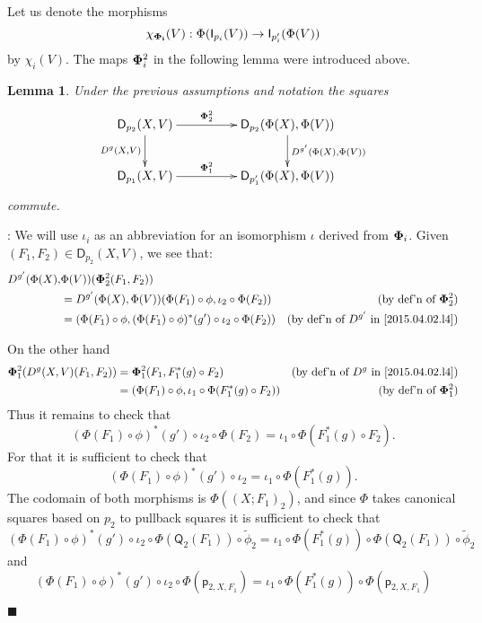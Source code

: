 \documentclass[12pt]{article}
\numberwithin{equation}{section}
\newenvironment{myproof}{{\bf Proof}:}{$\blacksquare$ \vskip 5mm }
\newtheorem{lemma}[proposition]{Lemma}
\newcommand{\by}[1]{\text{(by #1)}}
\newcommand{\sr}{\rightarrow}
\newcommand{\wt}{\widetilde}
\newcommand{\p}{\mathsf{p}}
\newcommand{\D}{\mathsf{D}}
\newcommand{\I}{\mathsf{I}}
\newcommand{\Q}{\mathsf{Q}}
\begin{document}
Let us denote the morphisms
%
$$\chi_{\bf\Phi_i}(V):\Phi(\I_{p_i}(V))\sr \I_{p'_i}(\Phi(V))$$
%
by $\chi_i(V)$. The maps ${\bf\Phi}_i^2$ in the following lemma were introduced above.
%
\begin{lemma}
\label{2015.04.08.l1} Under the previous assumptions and notation the squares
%
$$
\begin{xy}
          \xymatrix@C=4pc{ \D_{p_2}(X,V) \ar[r]^-{{\bf\Phi}_2^2}
            \ar[d]_{D^g(X,V)} & \D_{p_2}(\Phi(X),\Phi(V))
            \ar[d]^{D^{g'}(\Phi(X),\Phi(V))}\\ \D_{p_1}(X,V)
            \ar[r]^-{{\bf\Phi}_1^2} & \D_{p_1'}(\Phi(X),\Phi(V)) }
\end{xy}
$$
%
commute.
\end{lemma}
%
\begin{myproof}
We will use $\iota_i$ as an abbreviation for an isomorphism $\iota$ derived from ${\bf\Phi}_i$.
Given $(F_1,F_2)\in \D_{p_2}(X,V)$, we see that:
%
\begin{align*}
  D^{g'}(\Phi(X),&\Phi(V))({\bf\Phi}_2^2(F_1,F_2)) \\
    & = D^{g'}(\Phi(X),\Phi(V))(\Phi(F_1)\circ \phi, \iota_2\circ \Phi(F_2)) & \by{def'n of ${\bf\Phi}_2^2$} \\
    & = (\Phi(F_1)\circ \phi, (\Phi(F_1)\circ \phi)^*(g')\circ \iota_2\circ \Phi(F_2)) & \by{def'n of $D^{g'}$ in \ref{2015.04.02.l4}}
\end{align*}

On the other hand
%
\begin{align*}
  {\bf\Phi}_1^2(D^g(X,V)(F_1,F_2)) 
    & = {\bf\Phi}_1^2(F_1,F_1^*(g)\circ F_2)  & \by{def'n of $D^g$ in \ref{2015.04.02.l4}} \\
    & = (\Phi(F_1)\circ\phi,\iota_1\circ \Phi(F_1^*(g)\circ F_2)) & \by{def'n of ${\bf\Phi}_1^2$} 
\end{align*}
%
Thus it remains to check that
%
$$(\Phi(F_1)\circ \phi)^*(g')\circ \iota_2\circ \Phi(F_2)=\iota_1\circ
\Phi(F_1^*(g)\circ F_2).$$
%
For that it is sufficient to check that
%
$$(\Phi(F_1)\circ \phi)^*(g')\circ \iota_2=\iota_1\circ \Phi(F_1^*(g)).$$
%
The codomain of both morphisms is $\Phi((X;F_1)_2)$, and since $\Phi$ takes
canonical squares based on $p_2$ to pullback squares it is sufficient to check
that
%
$$(\Phi(F_1)\circ \phi)^*(g')\circ \iota_2\circ
\Phi(\Q_2(F_1))\circ\wt{\phi}_2=\iota_1\circ \Phi(F_1^*(g))\circ
\Phi(\Q_2(F_1))\circ\wt{\phi}_2$$
%
and
%
$$(\Phi(F_1)\circ \phi)^*(g')\circ \iota_2\circ \Phi(\p_{2,X,F_1})=\iota_1\circ
\Phi(F_1^*(g))\circ \Phi(\p_{2,X,F_1})$$
%


\end{myproof}
\end{document}
